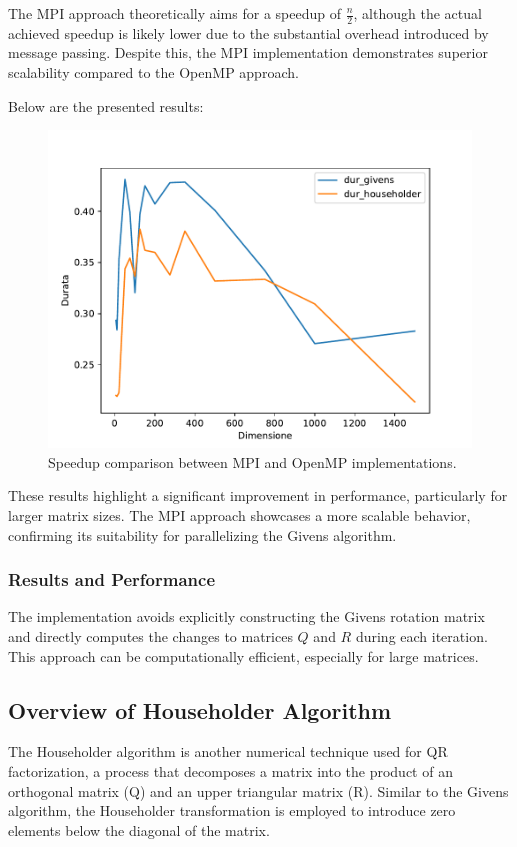 \documentclass{article}
\begin{document}
The MPI approach theoretically aims for a speedup of \( \frac{n}{2} \), although the actual achieved speedup is likely lower due to the substantial overhead introduced by message passing. Despite this, the MPI implementation demonstrates superior scalability compared to the OpenMP approach.

Below are the presented results:

\begin{figure}[h]
    \centering
    \includegraphics[width=0.8\linewidth]{grafico.pdf}
    \caption{Speedup comparison between MPI and OpenMP implementations.}
    \label{fig:speedup_comparison}
\end{figure}

These results highlight a significant improvement in performance, particularly for larger matrix sizes. The MPI approach showcases a more scalable behavior, confirming its suitability for parallelizing the Givens algorithm.



\subsubsection{Results and Performance}
The implementation avoids explicitly constructing the Givens rotation matrix and directly computes the changes to matrices $Q$ and $R$ during each iteration. This approach can be computationally efficient, especially for large matrices.



\subsection{Overview of Householder Algorithm}

The Householder algorithm is another numerical technique used for QR factorization, a process that decomposes a matrix into the product of an orthogonal matrix (Q) and an upper triangular matrix (R). Similar to the Givens algorithm, the Householder transformation is employed to introduce zero elements below the diagonal of the matrix.
\end{document}
